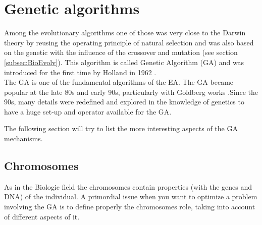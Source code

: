 \section{Genetic algorithms} \label{sec:GAdetail}
Among the evolutionary algorithms one of those was very close to the Darwin theory by reusing the operating principle of natural selection and was also based on the genetic with the influence of the crossover and mutation (see section \ref{subsec:BioEvolv}). This algorithm is called Genetic Algorithm (GA) and was introduced for the first time by Holland in 1962 \cite{111*Holland1962}. \\
The GA is one of the fundamental algorithms of the EA.
The GA became popular at the late 80s and early 90s, particularly with Goldberg works \cite{112*goldberg1989}.Since the 90s, many details were redefined and explored in the knowledge of genetics to have a huge set-up and operator available for the GA.
  
The following section will try to list the more interesting aspects of the GA mechanisms. 
 
%


\subsection{Chromosomes} \label{par:Chromosomes}
As in the Biologic field the chromosomes contain properties (with the genes and DNA) of the individual.
A primordial issue when you want to optimize a problem involving the GA is to define properly the chromosomes role, taking into account of different aspects of it.

